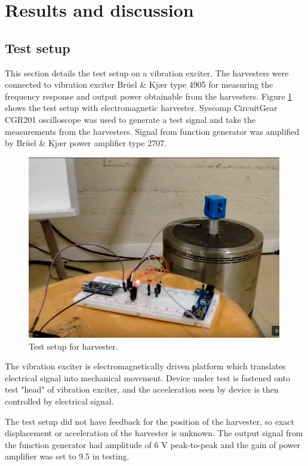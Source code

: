 \section{Results and discussion}\label{sect:results}
\subsection{Test setup} \label{sect:lg_test_setup}
This section details the test setup on a vibration exciter. The harvesters were connected to vibration exciter Brüel \& Kjær type 4905 for measuring the frequency response and output power obtainable from the harvesters. Figure \ref{fig:emh_shaker} shows the test setup with electromagnetic harvester. Syscomp CircuitGear CGR201 oscilloscope was used to generate a test signal and take the measurements from the harvesters. Signal from function generator was amplified by Brüel \& Kjær power amplifier type 2707.

\begin{figure}[htb]
\begin{center}
\includegraphics[height=8cm]{images/own_pic/shaker_setup/emh_shaker.png}
\end{center}
\caption{\label{fig:emh_shaker} Test setup for harvester.}
\end{figure}

The vibration exciter is electromagnetically driven platform which translates electrical signal into mechanical movement. Device under test is fastened onto test "head" of vibration exciter, and the acceleration seen by device is then controlled by electrical signal.

The test setup did not have feedback for the position of the harvester, so exact displacement or acceleration of the harvester is unknown. The output signal from the function generator had amplitude of 6 V peak-to-peak and the gain of power amplifier was set to 9.5 in testing.

